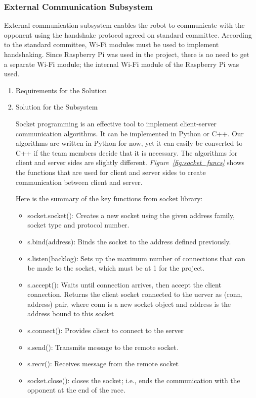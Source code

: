 \documentclass[a4paper,12pt]{article}
\begin{document}
	\subsubsection{External Communication Subsystem}	
	External communication subsystem enables the robot to communicate with the opponent using the handshake protocol agreed on standard committee. According to the standard committee, Wi-Fi modules must be used to implement handshaking. Since Raspberry Pi was used in the project, there is no need to get a separate Wi-Fi module; the internal Wi-Fi module of the Raspberry Pi was used.
		\begin{enumerate}
			\item {Requirements for the Solution}
			
			\item {Solution for the Subsystem}
			
			Socket programming is an effective tool to implement client-server communication algorithms. It can be implemented in Python or C++.  Our algorithms are written in Python for now, yet it can easily be converted to C++ if the team members decide that it is necessary. The algorithms for client and server sides are slightly different. \textit{Figure~\ref{fig:socket_funcs}} shows the functions that are used for client and server sides to create communication between client and server.
	
	
	
	Here is the summary of the key functions from socket library:
	
	\begin{itemize}
		\item socket.socket(): Creates a new socket using the given address family, socket type and protocol number.
		\item s.bind(address): Binds the socket to the address defined previously.
		\item s.listen(backlog): Sets up the maximum number of connections that can be made to the socket, which must be at 1 for the project.
		\item	s.accept(): Waits until connection arrives, then accept the client connection. Returns the client socket connected to the uerver as (conn, address) pair, where conn is a new socket object and address is the address bound to this socket
		\item	s.connect(): Provides client to connect to the server
		\item	s.send(): Transmits message to the remote socket.
		\item	s.recv(): Receives message from the remote socket
		\item	socket.close(): closes the socket; i.e., ends the communication with the opponent at the end of the race.
	\end{itemize}
	

\end{enumerate}
\end{document}
